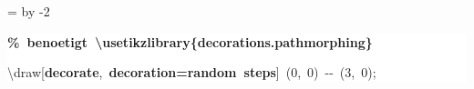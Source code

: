 \begingroup
\ttfamily
{}
=\textwidth
\advance{} by -2\fboxsep
\noindent
\colorbox{background}
{%
\parbox{\dimen255}
{%
\rule[-0.5ex]{0pt}{2.5ex}\hspace*{0.0em}\textcolor{G}{\textbf{\%~benoetigt~\textbackslash{}usetikzlibrary\{decorations.pathmorphing\}}}\\
\rule[-0.5ex]{0pt}{2.5ex}\hspace*{0.0em}\textbackslash{}draw[\textcolor{R}{\textbf{decorate}},~\textcolor{R}{\textbf{decoration=random~steps}}]~(0,~0)~{-}{-}~(3,~0);}%
}%
\endgroup
